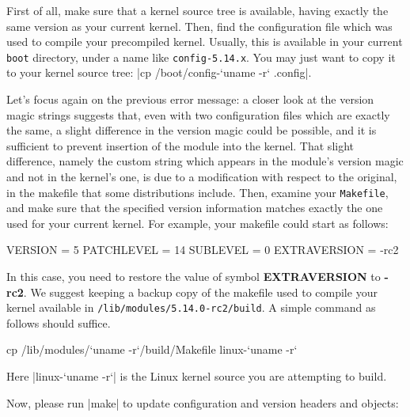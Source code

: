 \documentclass[10pt, oneside]{book}
\begin{document}
First of all, make sure that a kernel source tree is available, having exactly the same version as your current kernel.
Then, find the configuration file which was used to compile your precompiled kernel.
Usually, this is available in your current \verb|boot| directory, under a name like \verb|config-5.14.x|.
You may just want to copy it to your kernel source tree: \sh|cp /boot/config-`uname -r` .config|.

Let's focus again on the previous error message: a closer look at the version magic strings suggests that, even with two configuration files which are exactly the same, a slight difference in the version magic could be possible, and it is sufficient to prevent insertion of the module into the kernel.
That slight difference, namely the custom string which appears in the module's version magic and not in the kernel's one, is due to a modification with respect to the original, in the makefile that some distributions include.
Then, examine your \verb|Makefile|, and make sure that the specified version information matches exactly the one used for your current kernel.
For example, your makefile could start as follows:

\begin{codebash}
VERSION = 5
PATCHLEVEL = 14
SUBLEVEL = 0
EXTRAVERSION = -rc2
\end{codebash}

In this case, you need to restore the value of symbol \textbf{EXTRAVERSION} to \textbf{-rc2}.
We suggest keeping a backup copy of the makefile used to compile your kernel available in \verb|/lib/modules/5.14.0-rc2/build|.
A simple command as follows should suffice.
\begin{codebash}
cp /lib/modules/`uname -r`/build/Makefile linux-`uname -r`
\end{codebash}
Here \sh|linux-`uname -r`| is the Linux kernel source you are attempting to build.

Now, please run \sh|make| to update configuration and version headers and objects:

\end{document}
